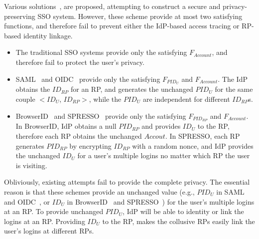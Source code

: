 
Various solutions~\cite{OpenIDConnect, SAMLIdentifier,BrowserID,SPRESSO}, are proposed, attempting to construct a secure and privacy-preserving SSO system.
However, these scheme provide at most two satisfying functions, and therefore fail to prevent either the IdP-based access tracing or RP-based identity linkage.
\begin{itemize}
  \item The traditional SSO systems provide only the satisfying $F_{Account}$, and therefore fail to protect the user's privacy.
  \item SAML~\cite{SAMLIdentifier} and OIDC~\cite{OpenIDConnect} provide only the satisfying $F_{PID_{U}}$ and $F_{Account}$.
        The IdP obtains the $ID_{RP}$ for an RP, and generates the unchanged $PID_{U}$ for the same couple $<ID_{U}$, $ID_{RP}>$,
        while the $PID_{U}$ are independent for different $ID_{RP}$s.
  \item BrowserID~\cite{BrowserID} and SPRESSO~\cite{SPRESSO} provide only the satisfying $F_{PID_{RP}}$ and $F_{Account}$.
        In BrowserID, IdP obtains a null $PID_{RP}$ and provides $ID_U$ to the RP, therefore each RP obtains the unchanged $Accout$.
        In SPRESSO, each RP generates $PID_{RP}$ by encrypting $ID_{RP}$ with a random nonce,
        and IdP provides the unchanged $ID_U$ for a user's multiple logins no matter which RP the user is visiting.
\end{itemize}

Obliviously, existing attempts fail to provide the complete  privacy.
The essential reason is that these schemes provide an unchanged value (e.g., $PID_{U}$ in SAML~\cite{SAMLIdentifier} and OIDC~\cite{OpenIDConnect}, or $ID_U$ in BrowserID~\cite{BrowserID} and SPRESSO~\cite{SPRESSO}) for the user's multiple logins at an RP.
To provide unchanged $PID_{U}$, IdP will be able to identity or link the logins at an RP.
Providing $ID_U$ to the RP, makes  the collusive RPs easily link the user's logins at different RPs.


